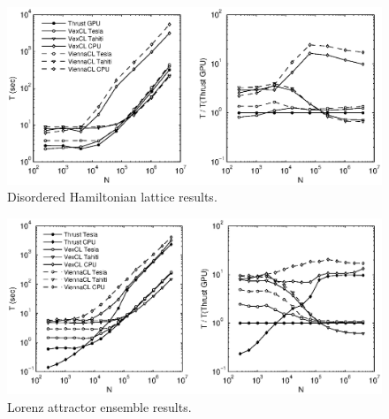 \documentclass[1p]{elsarticle}
\begin{document}
\begin{figure}[p]
    \begin{center}
        \includegraphics[width=\textwidth]{data/disordered_ham_lattice/perfcmp}
    \end{center}
    \caption{Disordered Hamiltonian lattice results.}
    \label{fig:lattice:perf}
\end{figure}

\begin{figure}[p]
    \begin{center}
        \includegraphics[width=\textwidth]{data/lorenz_ensemble/perfcmp}
    \end{center}
    \caption{Lorenz attractor ensemble results.}
    \label{fig:lorenz:perf}
\end{figure}
\end{document}
